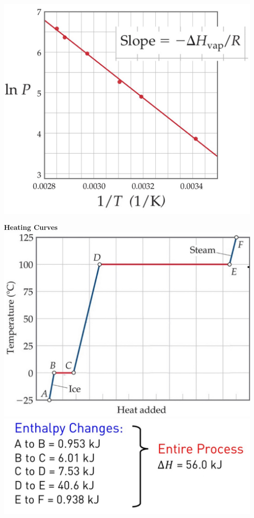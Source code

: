 \begin{minipage}{0.27\linewidth}
    \begin{center}
        \includegraphics[width = \linewidth]{images/Clausius-Clapyeron.jpeg}
       
    \end{center}
\end{minipage}
\begin{minipage}{0.27\linewidth}
\begin{center}
\textbf{Heating Curves}
   \includegraphics[width = \linewidth]{images/Heating_curve.jpeg} 
    \includegraphics[width = \linewidth]{images/Heating_curve_2.jpeg}
\end{center}
    
\end{minipage}

